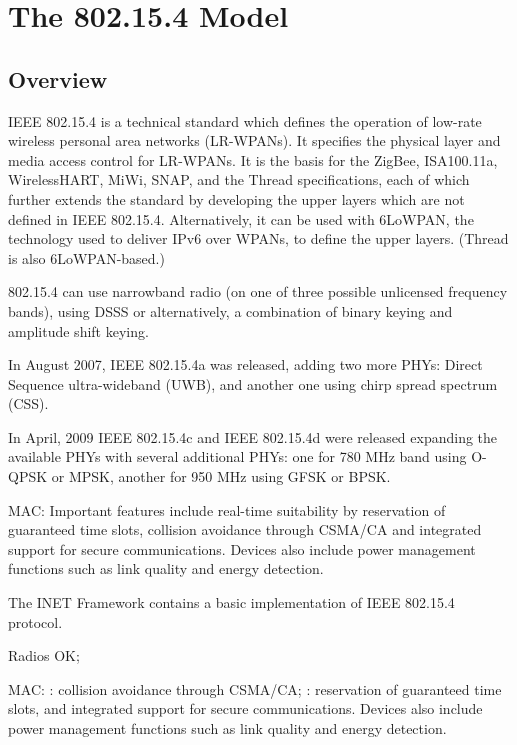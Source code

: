\ifdraft

\chapter{The 802.15.4 Model}
\label{cha:802154}

\section{Overview}

IEEE 802.15.4 is a technical standard which defines the operation of low-rate
wireless personal area networks (LR-WPANs). It specifies the physical layer and
media access control for LR-WPANs. It is the basis for the ZigBee, ISA100.11a,
WirelessHART, MiWi, SNAP, and the Thread specifications, each of which further
extends the standard by developing the upper layers which are not defined in
IEEE 802.15.4. Alternatively, it can be used with 6LoWPAN, the technology used
to deliver IPv6 over WPANs, to define the upper layers. (Thread is also
6LoWPAN-based.)


\begin{note}

802.15.4 can use narrowband radio (on one of three possible unlicensed frequency
bands), using DSSS or alternatively, a combination of binary keying and amplitude 
shift keying.

In August 2007, IEEE 802.15.4a was released, adding two more PHYs: Direct
Sequence ultra-wideband (UWB), and another one using chirp spread spectrum
(CSS).

In April, 2009 IEEE 802.15.4c and IEEE 802.15.4d were released expanding the
available PHYs with several additional PHYs: one for 780 MHz band using O-QPSK
or MPSK, another for 950 MHz using GFSK or BPSK.


MAC: Important features include real-time suitability by reservation of
guaranteed time slots, collision avoidance through CSMA/CA and integrated
support for secure communications. Devices also include power management
functions such as link quality and energy detection.

\end{note}

The INET Framework contains a basic implementation of IEEE 802.15.4 protocol.

Radios OK; 

MAC: : collision avoidance through CSMA/CA; : reservation
of guaranteed time slots, and integrated support for secure communications.
Devices also include power management functions such as link quality and energy
detection.


